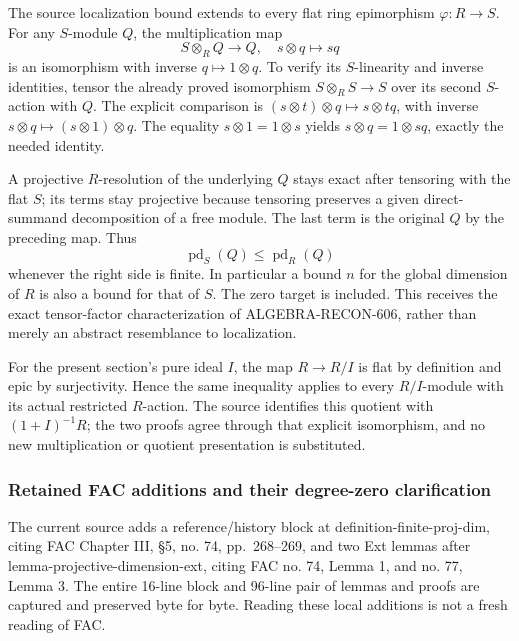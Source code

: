 The source localization bound extends to every flat ring epimorphism \(\varphi:R\to S\). For any \(S\)-module \(Q\), the multiplication map \[
S\otimes_RQ\longrightarrow Q,\quad s\otimes q\mapsto sq
\] is an isomorphism with inverse \(q\mapsto1\otimes q\). To verify its \(S\)-linearity and inverse identities, tensor the already proved isomorphism \(S\otimes_RS\to S\) over its second \(S\)-action with \(Q\). The explicit comparison is \((s\otimes t)\otimes q\mapsto s\otimes tq\), with inverse \(s\otimes q\mapsto(s\otimes1)\otimes q\). The equality \(s\otimes1=1\otimes s\) yields \(s\otimes q=1\otimes sq\), exactly the needed identity.

A projective \(R\)-resolution of the underlying \(Q\) stays exact after tensoring with the flat \(S\); its terms stay projective because tensoring preserves a given direct-summand decomposition of a free module. The last term is the original \(Q\) by the preceding map. Thus \[
\operatorname{pd}_S(Q)\le\operatorname{pd}_R(Q)
\] whenever the right side is finite. In particular a bound \(n\) for the global dimension of \(R\) is also a bound for that of \(S\). The zero target is included. This receives the exact tensor-factor characterization of ALGEBRA-\AlgebraIdentifierBreak{}RECON-\AlgebraIdentifierBreak{}606, rather than merely an abstract resemblance to localization.

For the present section's pure ideal \(I\), the map \(R\to R/I\) is flat by definition and epic by surjectivity. Hence the same inequality applies to every \(R/I\)-module with its actual restricted \(R\)-action. The source identifies this quotient with \((1+I)^{-1}R\); the two proofs agree through that explicit isomorphism, and no new multiplication or quotient presentation is substituted.

\subsubsection{Retained FAC additions and their degree-zero clarification}\label{algebra-proof-022-retained-fac-additions-and-their-degree-zero-clarification}

The current source adds a reference/history block at definition-\AlgebraIdentifierBreak{}finite-\AlgebraIdentifierBreak{}proj-\AlgebraIdentifierBreak{}dim, citing FAC Chapter III, §5, no. 74, pp.~268--269, and two Ext lemmas after lemma-\AlgebraIdentifierBreak{}projective-\AlgebraIdentifierBreak{}dimension-\AlgebraIdentifierBreak{}ext, citing FAC no. 74, Lemma 1, and no. 77, Lemma 3. The entire 16-line block and 96-line pair of lemmas and proofs are captured and preserved byte for byte. Reading these local additions is not a fresh reading of FAC.

